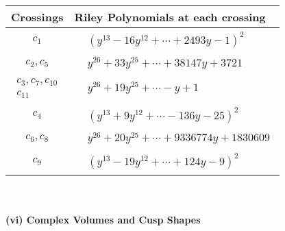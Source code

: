 \documentclass[1p]{elsarticle_modified}
\theoremstyle{definition}
\begin{document}
\begin{tabular}{m{50pt}|m{274pt}}
Crossings & \hspace{64pt}Riley Polynomials at each crossing \\
\hline $$\begin{aligned}c_{1}\end{aligned}$$&$\begin{aligned}
&(y^{13}-16 y^{12}+\cdots+2493 y-1)^{2}
\end{aligned}$\\
\hline $$\begin{aligned}c_{2},c_{5}\end{aligned}$$&$\begin{aligned}
&y^{26}+33 y^{25}+\cdots+38147 y+3721
\end{aligned}$\\
\hline $$\begin{aligned}c_{3},c_{7},c_{10}\\c_{11}\end{aligned}$$&$\begin{aligned}
&y^{26}+19 y^{25}+\cdots- y+1
\end{aligned}$\\
\hline $$\begin{aligned}c_{4}\end{aligned}$$&$\begin{aligned}
&(y^{13}+9 y^{12}+\cdots-136 y-25)^{2}
\end{aligned}$\\
\hline $$\begin{aligned}c_{6},c_{8}\end{aligned}$$&$\begin{aligned}
&y^{26}+20 y^{25}+\cdots+9336774 y+1830609
\end{aligned}$\\
\hline $$\begin{aligned}c_{9}\end{aligned}$$&$\begin{aligned}
&(y^{13}-19 y^{12}+\cdots+124 y-9)^{2}
\end{aligned}$\\
\hline
\end{tabular}\\~\\
\newpage\flushleft \textbf{(vi) Complex Volumes and Cusp Shapes}
\end{document}
